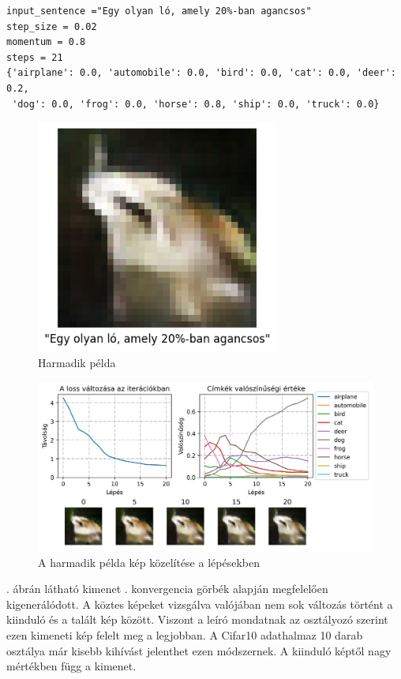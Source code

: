 
\begin{verbatim}
input_sentence ="Egy olyan ló, amely 20%-ban agancsos"
step_size = 0.02
momentum = 0.8
steps = 21
{'airplane': 0.0, 'automobile': 0.0, 'bird': 0.0, 'cat': 0.0, 'deer': 0.2,
 'dog': 0.0, 'frog': 0.0, 'horse': 0.8, 'ship': 0.0, 'truck': 0.0}
\end{verbatim}

\begin{figure}[h!]
	\centering
	\includegraphics[width=8cm]{images/demo03.png}
	\caption{Harmadik példa}
	\label{fig:demo3}
\end{figure}

\begin{figure}[h!]
	\centering
	\includegraphics[width=\textwidth]{images/demo03_conv.png}
	\caption{A harmadik példa kép közelítése a lépésekben}
	\label{fig:demo3_convergence}
\end{figure}

. ábrán látható kimenet . konvergencia görbék alapján megfelelően kigenerálódott. A köztes képeket vizsgálva valójában nem sok változás történt a kiinduló és a talált kép között. Viszont a leíró mondatnak az osztályozó szerint ezen kimeneti kép felelt meg a legjobban. A Cifar10 adathalmaz 10 darab osztálya már kisebb kihívást jelenthet ezen módszernek. A kiinduló képtől nagy mértékben függ a kimenet.

